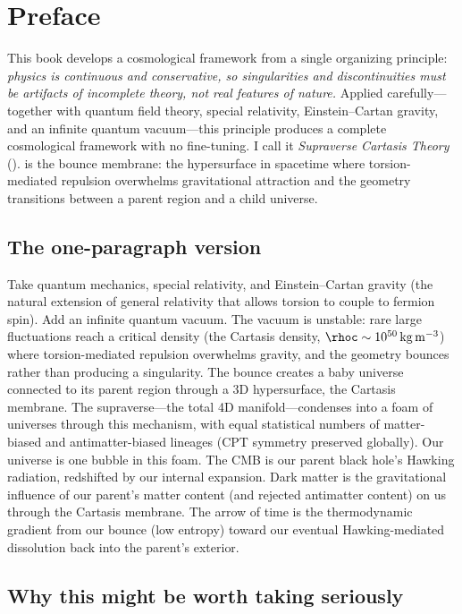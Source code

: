 \chapter*{Preface}

This book develops a cosmological framework from a single organizing principle:
\emph{physics is continuous and conservative, so singularities and
discontinuities must be artifacts of incomplete theory, not real features of
nature.} Applied carefully---together with quantum field theory, special
relativity, Einstein--Cartan gravity, and an infinite quantum vacuum---this
principle produces a complete cosmological framework with no fine-tuning. I call
it \emph{Supraverse Cartasis Theory} (\SCT). \Cartasis is the bounce
membrane: the hypersurface in spacetime where torsion-mediated repulsion
overwhelms gravitational attraction and the geometry transitions between a
parent region and a child universe.

\section*{The one-paragraph version}

Take quantum mechanics, special relativity, and Einstein--Cartan gravity (the
natural extension of general relativity that allows torsion to couple to
fermion spin). Add an infinite quantum vacuum. The vacuum is unstable: rare
large fluctuations reach a critical density (the Cartasis density,
$\rhoc \sim 10^{50}\,\mathrm{kg\,m^{-3}}$) where torsion-mediated repulsion
overwhelms gravity, and the geometry bounces rather than producing a
singularity. The bounce creates a baby universe connected to its parent region
through a 3D hypersurface, the Cartasis membrane. The supraverse---the total 4D
manifold---condenses into a foam of universes through this mechanism, with equal
statistical numbers of matter-biased and antimatter-biased lineages (CPT
symmetry preserved globally). Our universe is one bubble in this foam. The CMB
is our parent black hole's Hawking radiation, redshifted by our internal
expansion. Dark matter is the gravitational influence of our parent's matter
content (and rejected antimatter content) on us through the Cartasis membrane.
The arrow of time is the thermodynamic gradient from our bounce (low entropy)
toward our eventual Hawking-mediated dissolution back into the parent's exterior.

\section*{Why this might be worth taking seriously}

